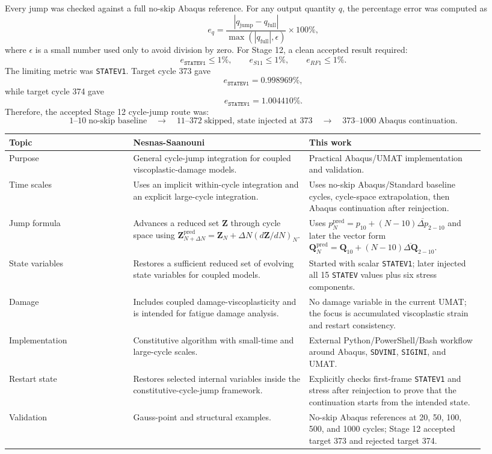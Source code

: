 \documentclass[11pt,a4paper]{article}
\begin{document}
Every jump was checked against a full no-skip Abaqus reference. For any output quantity $q$, the percentage error was computed as
\[
e_q
=
\frac{
\left|q_{\mathrm{jump}}-q_{\mathrm{full}}\right|
}{
\max\left(\left|q_{\mathrm{full}}\right|,\epsilon\right)
}
\times100\%,
\]
where $\epsilon$ is a small number used only to avoid division by zero. For Stage 12, a clean accepted result required:
\[
e_{\texttt{STATEV1}}\leq1\%,
\qquad
e_{S11}\leq1\%,
\qquad
e_{RF1}\leq1\%.
\]
The limiting metric was \texttt{STATEV1}. Target cycle 373 gave
\[
e_{\texttt{STATEV1}}=0.998969\%,
\]
while target cycle 374 gave
\[
e_{\texttt{STATEV1}}=1.004410\%.
\]
Therefore, the accepted Stage 12 cycle-jump route was:
\[
1\text{--}10
\;\text{no-skip baseline}
\quad\rightarrow\quad
11\text{--}372
\;\text{skipped, state injected at 373}
\quad\rightarrow\quad
373\text{--}1000
\;\text{Abaqus continuation}.
\]

\begin{longtable}{p{0.24\linewidth}p{0.34\linewidth}p{0.34\linewidth}}
\toprule
Topic & Nesnas-Saanouni & This work \\
\midrule
\endhead
Purpose & General cycle-jump integration for coupled viscoplastic-damage models. & Practical Abaqus/UMAT implementation and validation. \\
Time scales & Uses an implicit within-cycle integration and an explicit large-cycle integration. & Uses no-skip Abaqus/Standard baseline cycles, cycle-space extrapolation, then Abaqus continuation after reinjection. \\
Jump formula & Advances a reduced set $\mathbf{Z}$ through cycle space using $\mathbf{Z}_{N+\Delta N}^{\mathrm{pred}}=\mathbf{Z}_N+\Delta N(d\mathbf{Z}/dN)_N$. & Uses $p_N^{\mathrm{pred}}=p_{10}+(N-10)\overline{\Delta p}_{2-10}$ and later the vector form $\mathbf{Q}_N^{\mathrm{pred}}=\mathbf{Q}_{10}+(N-10)\overline{\Delta\mathbf{Q}}_{2-10}$. \\
State variables & Restores a sufficient reduced set of evolving state variables for coupled models. & Started with scalar \texttt{STATEV1}; later injected all 15 \texttt{STATEV} values plus six stress components. \\
Damage & Includes coupled damage-viscoplasticity and is intended for fatigue damage analysis. & No damage variable in the current UMAT; the focus is accumulated viscoplastic strain and restart consistency. \\
Implementation & Constitutive algorithm with small-time and large-cycle scales. & External Python/PowerShell/Bash workflow around Abaqus, \texttt{SDVINI}, \texttt{SIGINI}, and UMAT. \\
Restart state & Restores selected internal variables inside the constitutive-cycle-jump framework. & Explicitly checks first-frame \texttt{STATEV1} and stress after reinjection to prove that the continuation starts from the intended state. \\
Validation & Gauss-point and structural examples. & No-skip Abaqus references at 20, 50, 100, 500, and 1000 cycles; Stage 12 accepted target 373 and rejected target 374. \\
\bottomrule
\end{longtable}
\end{document}
